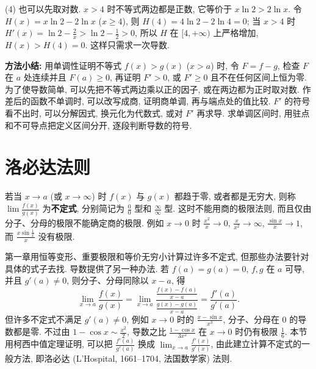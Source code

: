 \documentclass[UTF8,openany]{ctexbook}
\theoremstyle{chinesetextbook}
\begin{document}
(4) 也可以先取对数. $x>4$ 时不等式两边都是正数, 它等价于 $x\ln2>2\ln x$. 令 $H(x)=x\ln2-2\ln x$ ($x\ge4$), 则 $H(4)=4\ln2-2\ln4=0$; 当 $x>4$ 时 $\displaystyle H'(x)=\ln2-\frac2x>\ln2-\frac12>0$, 所以 $H$ 在 $[4,+\infty)$ 上严格增加, $H(x)>H(4)=0$. 这样只需求一次导数.
\par\indent\textbf{方法小结:} 用单调性证明不等式 $f(x)>g(x)$ ($x>a$) 时, 令 $F=f-g$, 检查 $F$ 在 $a$ 处连续并且 $F(a)\ge0$, 再证明 $F'>0$, 或 $F'\ge0$ 且不在任何区间上恒为零. 为了使导数简单, 可以先把不等式两边乘以正的因子, 或在两边都为正时取对数. 作差后的函数不单调时, 可以改写成商, 证明商单调, 再与端点处的值比较. $F'$ 的符号看不出时, 可以分解因式, 换元化为代数式, 或对 $F'$ 再求导. 求单调区间时, 用驻点和不可导点把定义区间分开, 逐段判断导数的符号.
\section{洛必达法则}
若当 $x\to a$ (或 $x\to\infty$) 时 $f(x)$ 与 $g(x)$ 都趋于零, 或者都是无穷大, 则称 $\displaystyle\lim\frac{f(x)}{g(x)}$ 为\textbf{不定式}, 分别简记为 $\displaystyle\frac00$ 型和 $\displaystyle\frac\infty\infty$ 型. 这时不能用商的极限法则, 而且仅由分子、分母的极限不能确定商的极限. 例如 $x\to0$ 时 $\displaystyle\frac{x^2}x\to0$, $\displaystyle\frac x{x^2}\to\infty$, $\displaystyle\frac{\sin x}x\to1$, 而 $\displaystyle\frac{x\sin\frac1x}x$ 没有极限.

第一章用恒等变形、重要极限和等价无穷小计算过许多不定式, 但那些办法要针对具体的式子去找. 导数提供了另一种办法. 若 $f(a)=g(a)=0$, $f,g$ 在 $a$ 可导, 并且 $g'(a)\ne0$, 则分子、分母同除以 $x-a$, 得
\[
\lim_{x\to a}\frac{f(x)}{g(x)}=\lim_{x\to a}\frac{\frac{f(x)-f(a)}{x-a}}{\frac{g(x)-g(a)}{x-a}}=\frac{f'(a)}{g'(a)}.
\]
但许多不定式不满足 $g'(a)\ne0$, 例如 $x\to0$ 时的 $\displaystyle\frac{x-\sin x}{x^3}$, 分子、分母在 $0$ 的导数都是零. 不过由 $\displaystyle1-\cos x\sim\frac{x^2}2$, 导数之比 $\displaystyle\frac{1-\cos x}{3x^2}$ 在 $x\to0$ 时仍有极限 $\displaystyle\frac16$. 本节用柯西中值定理证明, 可以把 $\displaystyle\frac{f'(a)}{g'(a)}$ 换成 $\displaystyle\lim_{x\to a}\frac{f'(x)}{g'(x)}$, 由此建立计算不定式的一般方法, 即洛必达 (L'Hospital, 1661--1704, 法国数学家) 法则.
\end{document}
